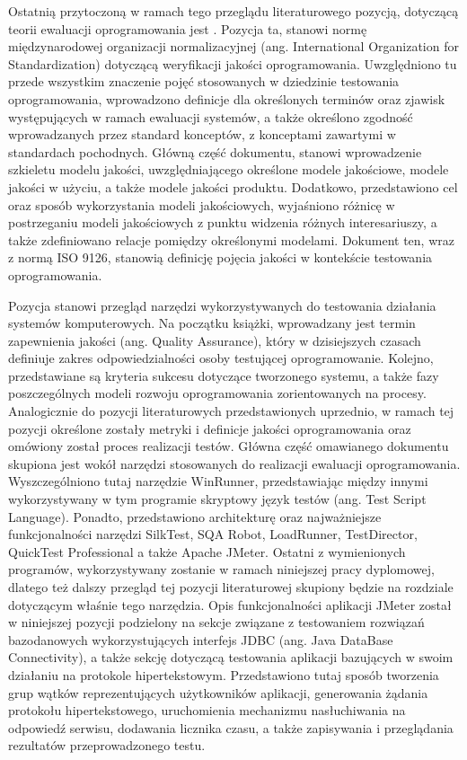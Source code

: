 Ostatnią przytoczoną w ramach tego przeglądu literaturowego pozycją, dotyczącą teorii ewaluacji oprogramowania jest \cite{25010:2011}. Pozycja ta, stanowi normę międzynarodowej organizacji normalizacyjnej (ang. International Organization for Standardization) dotyczącą weryfikacji jakości oprogramowania. Uwzględniono tu przede wszystkim znaczenie pojęć stosowanych w dziedzinie testowania oprogramowania, wprowadzono definicje dla określonych terminów oraz zjawisk występujących w ramach ewaluacji systemów, a także określono zgodność wprowadzanych przez standard konceptów, z konceptami zawartymi w standardach pochodnych. Główną część dokumentu, stanowi wprowadzenie szkieletu modelu jakości, uwzględniającego określone modele jakościowe, modele jakości w użyciu, a także modele jakości produktu. Dodatkowo, przedstawiono cel oraz sposób wykorzystania modeli jakościowych, wyjaśniono różnicę w postrzeganiu modeli jakościowych z punktu widzenia różnych interesariuszy, a także zdefiniowano relacje pomiędzy określonymi modelami. Dokument ten, wraz z normą ISO 9126, stanowią definicję pojęcia jakości w kontekście testowania oprogramowania.

Pozycja \cite{prasad2004software} stanowi przegląd narzędzi wykorzystywanych do testowania działania systemów komputerowych. Na początku książki, wprowadzany jest termin zapewnienia jakości (ang. Quality Assurance), który w dzisiejszych czasach definiuje zakres odpowiedzialności osoby testującej oprogramowanie. Kolejno, przedstawiane są kryteria sukcesu dotyczące tworzonego systemu, a także fazy poszczególnych modeli rozwoju oprogramowania zorientowanych na procesy. Analogicznie do pozycji literaturowych przedstawionych uprzednio, w ramach tej pozycji określone zostały metryki i definicje jakości oprogramowania oraz omówiony został proces realizacji testów. Główna część omawianego dokumentu skupiona jest wokół narzędzi stosowanych do realizacji ewaluacji oprogramowania. Wyszczególniono tutaj narzędzie WinRunner, przedstawiając między innymi wykorzystywany w tym programie skryptowy język testów (ang. Test Script Language). Ponadto, przedstawiono architekturę oraz najważniejsze funkcjonalności narzędzi SilkTest, SQA Robot, LoadRunner, TestDirector, QuickTest Professional a także Apache JMeter. Ostatni z wymienionych programów, wykorzystywany zostanie w ramach niniejszej pracy dyplomowej, dlatego też dalszy przegląd tej pozycji literaturowej skupiony będzie na rozdziale dotyczącym właśnie tego narzędzia. Opis funkcjonalności aplikacji JMeter został w niniejszej pozycji podzielony na sekcje związane z testowaniem rozwiązań bazodanowych wykorzystujących interfejs JDBC (ang. Java DataBase Connectivity), a także sekcję dotyczącą testowania aplikacji bazujących w swoim działaniu na protokole hipertekstowym. Przedstawiono tutaj sposób tworzenia grup wątków reprezentujących użytkowników aplikacji, generowania żądania protokołu hipertekstowego, uruchomienia mechanizmu nasłuchiwania na odpowiedź serwisu, dodawania licznika czasu, a także zapisywania i przeglądania rezultatów przeprowadzonego testu.

